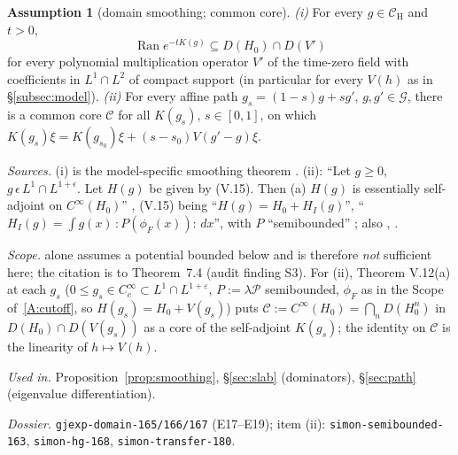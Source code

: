 \documentclass[11pt,a4paper]{article}
\theoremstyle{plain}
\theoremstyle{definition}
\newtheorem{assumption}{Assumption}
\theoremstyle{plain}
\theoremstyle{definition}
\newcommand{\G}{\mathcal{G}}
\newcommand{\CH}{\mathcal{C}_{\mathrm H}}
\DeclareMathOperator{\Ran}{Ran}
\begin{document}
\begin{assumption}[domain smoothing; common core]\label{A:domain}
\emph{(i)} For every $g\in\CH$ and $t>0$,
\[
 \Ran e^{-tK(g)}\subseteq D(H_0)\cap D(V')
\]
for every polynomial multiplication operator $V'$ of the time-zero field with coefficients in
$L^1\cap L^2$ of compact support (in particular for every $V(h)$ as in
\S\ref{subsec:model}).
\emph{(ii)} For every affine path $g_s=(1-s)g+sg'$, $g,g'\in\G$, there is a common core
$\mathscr C$ for all $K(g_s)$, $s\in[0,1]$, on which
$K(g_s)\xi=K(g_{s_0})\xi+(s-s_0)V(g'-g)\xi$.

\emph{Sources.} (i) is the model-specific smoothing theorem \cite[Ch.~7, Thm.~7.4]{GJExp}.
(ii): ``Let $g\ge0$, $g\,\epsilon\,L^1\cap L^{1+\epsilon}$.  Let $H(g)$ be given by (V.15).
Then (a) $H(g)$ is essentially self-adjoint on $C^\infty(H_0)$'' \cite[Thm.~V.12, p.~158]{SimonBook}, %
(V.15) being ``$H(g)=H_0+H_I(g)$'', ``$H_I(g)=\int g(x)\,{:}P(\phi_F(x)){:}\,dx$'', with $P$
``semibounded'' \cite[pp.~141, 146]{SimonBook}; also \cite[Thm.~5.3]{Rosen70}, \cite{GJ2}.

\emph{Scope.} \cite[Thm.~7.3]{GJExp} alone assumes a potential bounded below %
and is therefore \emph{not} sufficient here; the citation is to Theorem~7.4
(audit finding S3).  For (ii), Theorem V.12(a) at each $g_s$ %
($0\le g_s\in C_c^\infty\subset L^1\cap L^{1+\varepsilon}$, $P:=\lambda\mathscr P$
semibounded, $\phi_F$ as in the Scope of~\ref{A:cutoff}, so $H(g_s)=H_0+V(g_s)$) puts
$\mathscr C:=C^\infty(H_0)=\bigcap_nD(H_0^n)$ in $D(H_0)\cap D(V(g_s))$ as a core of the
self-adjoint $K(g_s)$; the identity on $\mathscr C$ is the linearity of $h\mapsto V(h)$.

\emph{Used in.} Proposition~\ref{prop:smoothing}, \S\ref{sec:slab} (dominators),
\S\ref{sec:path} (eigenvalue differentiation).

{\raggedright\emph{Dossier.} \texttt{gjexp-domain-165/166/167} (E17--E19); item (ii):
\texttt{simon-semibounded-163}, \texttt{simon-hg-168}, \texttt{simon-transfer-180}.\par}
\end{assumption}
\end{document}
